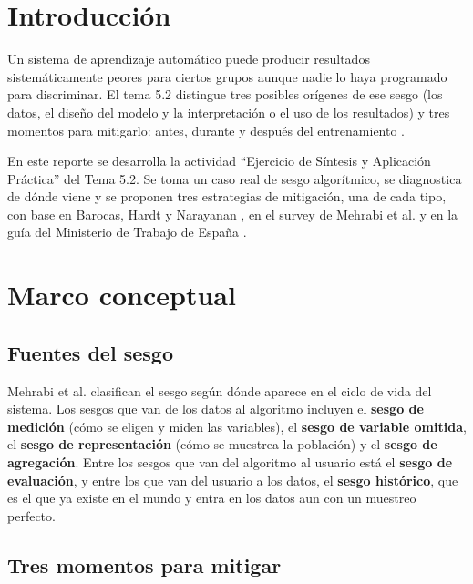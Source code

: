 \documentclass[11pt,letterpaper]{article}
\begin{document}
\portada
\indicegeneral

\section{Introducción}

Un sistema de aprendizaje automático puede producir resultados sistemáticamente peores para ciertos grupos aunque nadie lo haya programado para discriminar. El tema 5.2 distingue tres posibles orígenes de ese sesgo (los datos, el diseño del modelo y la interpretación o el uso de los resultados) y tres momentos para mitigarlo: antes, durante y después del entrenamiento \parencite{iae_u5_t52}.

En este reporte se desarrolla la actividad ``Ejercicio de Síntesis y Aplicación Práctica'' del Tema 5.2. Se toma un caso real de sesgo algorítmico, se diagnostica de dónde viene y se proponen tres estrategias de mitigación, una de cada tipo, con base en Barocas, Hardt y Narayanan \parencite{barocas2023}, en el survey de Mehrabi et al. \parencite{mehrabi2021} y en la guía del Ministerio de Trabajo de España \parencite{mites2022}.

\section{Marco conceptual}

\subsection{Fuentes del sesgo}

Mehrabi et al. \parencite{mehrabi2021} clasifican el sesgo según dónde aparece en el ciclo de vida del sistema. Los sesgos que van de los datos al algoritmo incluyen el \textbf{sesgo de medición} (cómo se eligen y miden las variables), el \textbf{sesgo de variable omitida}, el \textbf{sesgo de representación} (cómo se muestrea la población) y el \textbf{sesgo de agregación}. Entre los sesgos que van del algoritmo al usuario está el \textbf{sesgo de evaluación}, y entre los que van del usuario a los datos, el \textbf{sesgo histórico}, que es el que ya existe en el mundo y entra en los datos aun con un muestreo perfecto.

\subsection{Tres momentos para mitigar}
\end{document}
